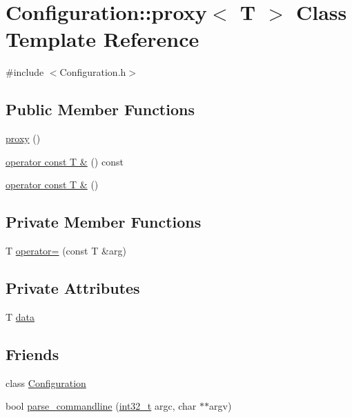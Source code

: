\section{Configuration\-:\-:proxy$<$ T $>$ Class Template Reference}
\label{class_configuration_1_1proxy}


{\ttfamily \#include $<$Configuration.\-h$>$}

\subsection*{Public Member Functions}
\begin{DoxyCompactItemize}
\item 
\hyperlink{class_configuration_1_1proxy_ab4337c85e11d9a259e394590c07a5fe4}{proxy} ()
\item 
\hyperlink{class_configuration_1_1proxy_a38a07083e576ba14cabfc23461e8c089}{operator const T \&} () const 
\item 
\hyperlink{class_configuration_1_1proxy_a631982c73c73189824f209c1178cff2d}{operator const T \&} ()
\end{DoxyCompactItemize}
\subsection*{Private Member Functions}
\begin{DoxyCompactItemize}
\item 
T \hyperlink{class_configuration_1_1proxy_a80e382c028406f4599ef088f0d64849b}{operator=} (const T \&arg)
\end{DoxyCompactItemize}
\subsection*{Private Attributes}
\begin{DoxyCompactItemize}
\item 
T \hyperlink{class_configuration_1_1proxy_aeff1982d30095641c59ada398672b8e1}{data}
\end{DoxyCompactItemize}
\subsection*{Friends}
\begin{DoxyCompactItemize}
\item 
class \hyperlink{class_configuration_1_1proxy_a30221ddc558692a7b52598b963a74bc2}{Configuration}
\item 
bool \hyperlink{class_configuration_1_1proxy_a77d8ecb3e2084eecf8db1cf62276bcf0}{parse\-\_\-commandline} (\hyperlink{stdint_8h_a32f2e37ee053cf2ce8ca28d1f74630e5}{int32\-\_\-t} argc, char $\ast$$\ast$argv)
\end{DoxyCompactItemize}


